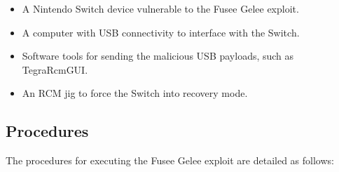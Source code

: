 \begin{itemize}
    \item A Nintendo Switch device vulnerable to the Fusee Gelee exploit.
    \item A computer with USB connectivity to interface with the Switch.
    \item Software tools for sending the malicious USB payloads, such as TegraRcmGUI.
    \item An RCM jig to force the Switch into recovery mode.
\end{itemize}

\subsection{Procedures}

The procedures for executing the Fusee Gelee exploit are detailed as follows:

